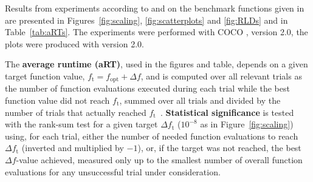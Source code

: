 \documentclass[sigconf]{acmart}
\newcommand{\Df}{\ensuremath{\Delta f}}
\newcommand{\fopt}{\ensuremath{f_\mathrm{opt}}}
\newcommand{\ftarget}{\ensuremath{f_\mathrm{t}}}
\newcommand{\change}[1]{{\color{red} #1}}
\begin{document}
Results from experiments according to \cite{hansen2016exp} and \cite{hansen2016perfass} on the benchmark
functions given in \cite{wp200901_2010,hansen2010fun} are presented in
Figures~\ref{fig:scaling}, \ref{fig:scatterplots} and \ref{fig:RLDs} and
in Table~\ref{tab:aRTs}. The experiments were performed with COCO \cite{hansen2016cocoplat},
version \change{2.0}, the plots were produced with version \change{2.0}.

The \textbf{average runtime (aRT)}, used in the figures and table, depends on a
given target function value, $\ftarget=\fopt+\Df$, and is computed over all relevant trials
as the number of function evaluations executed during each trial while the best
function value did not reach \ftarget, summed over all trials
and divided by the number of trials that actually reached \ftarget\
\cite{hansen2010exp,price1997dev}.
\textbf{Statistical significance} is tested with the rank-sum test for a given
target $\Delta\ftarget$ ($10^{-8}$ as in Figure~\ref{fig:scaling}) using,
for each trial, either the number of needed function evaluations to reach
$\Delta\ftarget$ (inverted and multiplied by $-1$), or, if the target was not
reached, the best $\Df$-value achieved, measured only up to the smallest number
of overall function evaluations for any unsuccessful trial under consideration.



\end{document}
